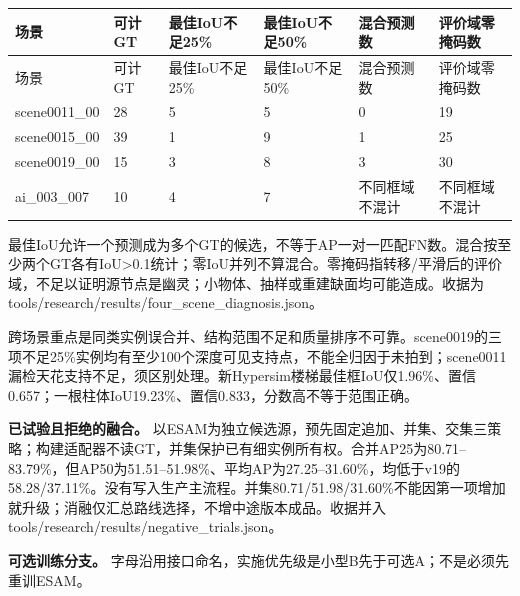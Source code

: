 \documentclass[UTF8,fontset=fandol]{ctexart}
\begin{document}
{\small
\begin{longtable}{|p{}|p{}|p{}|p{}|p{}|p{}|}
\hline
场景 & 可计GT & 最佳IoU不足25\% & 最佳IoU不足50\% & 混合预测数 & 评价域零掩码数 \\ \hline
\endfirsthead
\hline
场景 & 可计GT & 最佳IoU不足25\% & 最佳IoU不足50\% & 混合预测数 & 评价域零掩码数 \\ \hline
\endhead
scene0011\_00 & 28 & 5 & 5 & 0 & 19 \\ \hline
scene0015\_00 & 39 & 1 & 9 & 1 & 25 \\ \hline
scene0019\_00 & 15 & 3 & 8 & 3 & 30 \\ \hline
ai\_003\_007 & 10 & 4 & 7 & 不同框域不混计 & 不同框域不混计 \\ \hline
\end{longtable}
}

最佳IoU允许一个预测成为多个GT的候选，不等于AP一对一匹配FN数。混合按至少两个GT各有IoU>0.1统计；零IoU并列不算混合。零掩码指转移/平滑后的评价域，不足以证明源节点是幽灵；小物体、抽样或重建缺面均可能造成。收据为tools/research/results/four\_scene\_diagnosis.json。



跨场景重点是同类实例误合并、结构范围不足和质量排序不可靠。scene0019的三项不足25\%实例均有至少100个深度可见支持点，不能全归因于未拍到；scene0011漏检天花支持不足，须区别处理。新Hypersim楼梯最佳框IoU仅1.96\%、置信0.657；一根柱体IoU19.23\%、置信0.833，分数高不等于范围正确。



\textbf{已试验且拒绝的融合。} 以ESAM为独立候选源，预先固定追加、并集、交集三策略；构建适配器不读GT，并集保护已有细实例所有权。合并AP25为80.71–83.79\%，但AP50为51.51–51.98\%、平均AP为27.25–31.60\%，均低于v19的58.28/37.11\%。没有写入生产主流程。并集80.71/51.98/31.60\%不能因第一项增加就升级；消融仅汇总路线选择，不增中途版本成品。收据并入tools/research/results/negative\_trials.json。



\textbf{可选训练分支。} 字母沿用接口命名，实施优先级是小型B先于可选A；不是必须先重训ESAM。
\end{document}

